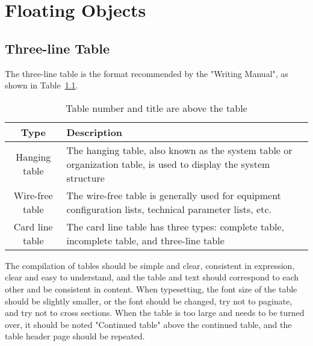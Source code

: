 
\chapter{Floating Objects}

\section{Three-line Table}

The three-line table is the format recommended by the "Writing Manual", as shown in Table~\ref{tab:exampletable}.
\begin{table}[htb]
  \centering\small
  \caption{Table number and title are above the table}
  \label{tab:exampletable}
  \begin{tabular}{cl}
    \toprule
    Type   & Description                                       \\
    \midrule
    Hanging table & The hanging table, also known as the system table or organization table, is used to display the system structure \\
    Wire-free table & The wire-free table is generally used for equipment configuration lists, technical parameter lists, etc.   \\
    Card line table & The card line table has three types: complete table, incomplete table, and three-line table       \\
    \bottomrule
  \end{tabular}
\end{table}

The compilation of tables should be simple and clear, consistent in expression, clear and easy to understand, and the table and text should correspond to each other and be consistent in content.
When typesetting, the font size of the table should be slightly smaller, or the font should be changed, try not to paginate, and try not to cross sections.
When the table is too large and needs to be turned over, it should be noted "Continued table" above the continued table, and the table header page should be repeated.



